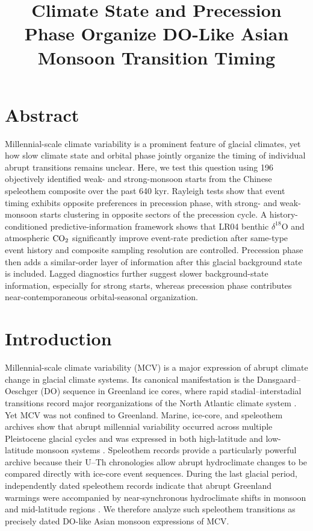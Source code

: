 \documentclass[11pt]{article}
\title{Climate State and Precession Phase Organize DO-Like Asian Monsoon Transition Timing}
\author{}
\date{}
\begin{document}
\maketitle

\section*{Abstract}

Millennial-scale climate variability is a prominent feature of glacial climates, yet how slow climate state and orbital phase jointly organize the timing of individual abrupt transitions remains unclear. Here, we test this question using 196 objectively identified weak- and strong-monsoon starts from the Chinese speleothem composite over the past 640 kyr. Rayleigh tests show that event timing exhibits opposite preferences in precession phase, with strong- and weak-monsoon starts clustering in opposite sectors of the precession cycle. A history-conditioned predictive-information framework shows that LR04 benthic \(\delta^{18}\mathrm{O}\) and atmospheric \(\ce{CO2}\) significantly improve event-rate prediction after same-type event history and composite sampling resolution are controlled. Precession phase then adds a similar-order layer of information after this glacial background state is included. Lagged diagnostics further suggest slower background-state information, especially for strong starts, whereas precession phase contributes near-contemporaneous orbital-seasonal organization.

\section*{Introduction}

Millennial-scale climate variability (MCV) is a major expression of abrupt climate change in glacial climate systems. Its canonical manifestation is the Dansgaard--Oeschger (DO) sequence in Greenland ice cores, where rapid stadial--interstadial transitions record major reorganizations of the North Atlantic climate system \citep{rasmussen2014stratigraphic}. Yet MCV was not confined to Greenland. Marine, ice-core, and speleothem archives show that abrupt millennial variability occurred across multiple Pleistocene glacial cycles and was expressed in both high-latitude and low-latitude monsoon systems \citep{barker2011800, sun2021persistent, hodell20231}. Speleothem records provide a particularly powerful archive because their U--Th chronologies allow abrupt hydroclimate changes to be compared directly with ice-core event sequences. During the last glacial period, independently dated speleothem records indicate that abrupt Greenland warmings were accompanied by near-synchronous hydroclimate shifts in monsoon and mid-latitude regions \citep{corrick2020synchronous}. We therefore analyze such speleothem transitions as precisely dated DO-like Asian monsoon expressions of MCV.
\end{document}
